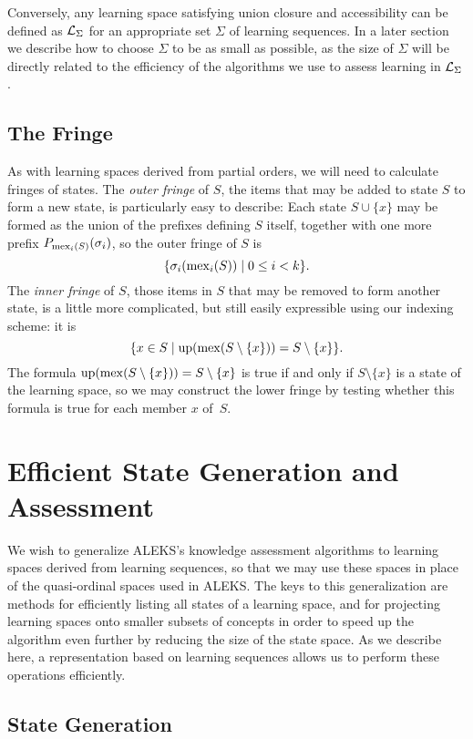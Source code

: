 \documentclass[11pt]{llncs}
\begin{document}
{Conversely, any learning space satisfying union closure and accessibility can be defined as ${\cal L}_\Sigma$ for an appropriate set $\Sigma$ of learning sequences. In a later section we describe how to choose $\Sigma$ to be as small as possible, as the size of $\Sigma$ will be directly related to the efficiency of the algorithms we use to assess learning in ${\cal L}_\Sigma$.

\subsection{The Fringe}

As with learning spaces derived from partial orders, we will need to calculate fringes of states.
The \emph{outer fringe} of $S$, the items that may be added to state $S$ to form a new state,
is particularly easy to describe: Each state $S\cup\{x\}$ may be formed as the union of the prefixes defining $S$ itself, together
with one more prefix $P_{{\rm mex}_i(S)}(\sigma_i)$, so the outer fringe of $S$ is
$$\{\sigma_i({\rm mex}_i(S))\mid 0\le i<k\}.$$
The \emph{inner fringe} of $S$, those items in $S$ that may be removed to form another state,
is a little more complicated, but still easily expressible using our indexing scheme: it is
$$\{x\in S\mid {\rm up}({\rm mex}(S\setminus\{x\}))=S\setminus\{x\}\}.$$
The formula ${\rm up}({\rm mex}(S\setminus\{x\}))=S\setminus\{x\}$ is true if and only if $S\setminus\{x\}$ is a state of the learning space, so we may construct the lower fringe by testing whether this formula is true for each member $x$ of~$S$.

\section{Efficient State Generation and Assessment}

We wish to generalize ALEKS's knowledge assessment algorithms to learning spaces derived from learning sequences, so that we may use these spaces in place of the quasi-ordinal spaces used in ALEKS. The keys to this generalization are methods for efficiently listing all states of a learning space, and for projecting learning spaces onto smaller subsets of concepts in order to speed up the algorithm even further by reducing the size of the state space. As we describe here, a representation based on learning sequences allows us to perform these operations efficiently.

\subsection{State Generation}

}
\end{document}
